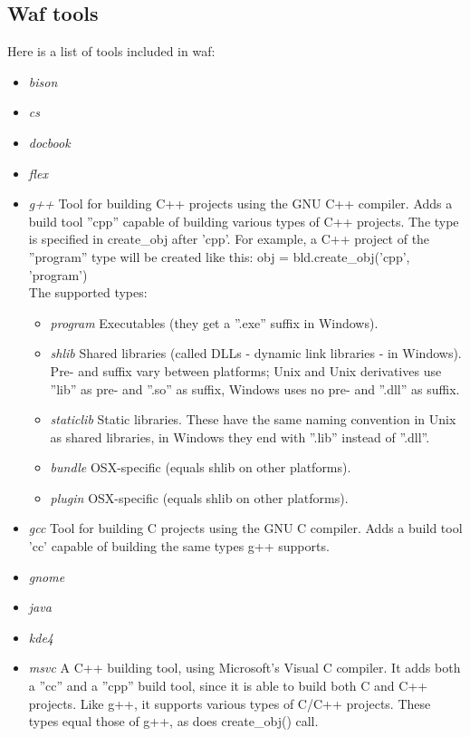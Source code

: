 \documentclass[a4paper,10pt]{article}
\begin{document}
\subsection{Waf tools}
Here is a list of tools included in waf:
\begin{itemize}
	\item \emph{bison}
	\item \emph{cs}
	\item \emph{docbook}
	\item \emph{flex}
	\item \emph{g++}
		Tool for building C++ projects using the GNU C++ compiler. Adds a build tool ''cpp'' capable of building various types of C++ projects. The type is specified in create\_obj after 'cpp'. For example, a C++ project of the ''program'' type will be created like this: obj = bld.create\_obj('cpp', 'program')\\
		The supported types:
		\begin{itemize}
			\item \emph{program} Executables (they get a ''.exe'' suffix in Windows).
			\item \emph{shlib} Shared libraries (called DLLs - dynamic link libraries - in Windows). Pre- and suffix vary between platforms; Unix and Unix derivatives use ''lib'' as pre- and ''.so'' as suffix, Windows uses no pre- and ''.dll'' as suffix.
			\item \emph{staticlib} Static libraries. These have the same naming convention in Unix as shared libraries, in Windows they end with ''.lib'' instead of ''.dll''.
			\item \emph{bundle} OSX-specific (equals shlib on other platforms).
			\item \emph{plugin} OSX-specific (equals shlib on other platforms).
		\end{itemize}
	\item \emph{gcc}
		Tool for building C projects using the GNU C compiler. Adds a build tool 'cc' capable of building the same types g++ supports.
	\item \emph{gnome}
	\item \emph{java}
	\item \emph{kde4}
	\item \emph{msvc}
		A C++ building tool, using Microsoft's Visual C compiler. It adds both a ''cc'' and a ''cpp'' build tool, since it is able to build both C and C++ projects. Like g++, it supports various types of C/C++ projects. These types equal those of g++, as does create\_obj() call.\\

\end{itemize}
\end{document}

